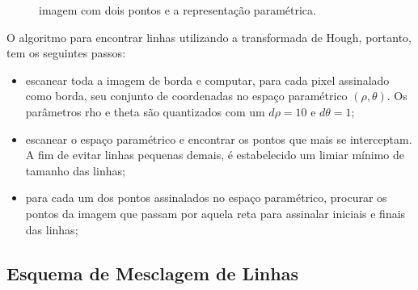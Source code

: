 \begin{figure}[h]
  \centering
  \hfill
  \caption{imagem com dois pontos e a representação paramétrica.}
  \label{houghlinhas}
\end{figure}


O algoritmo para encontrar linhas utilizando a transformada de Hough, portanto, tem os seguintes passos: 
\begin{itemize}
\item escanear toda a imagem de borda e computar, para cada pixel assinalado como borda, seu conjunto de coordenadas no espaço paramétrico $(\rho,\theta)$. Os parâmetros rho e theta são quantizados com um $d\rho = 10$ e $d\theta = 1$;
\item escanear o espaço paramétrico e encontrar os pontos que mais se interceptam. A fim de evitar linhas pequenas demais, é estabelecido um limiar mínimo de tamanho das linhas;
\item para cada um dos pontos assinalados no espaço paramétrico, procurar os pontos da imagem que passam por aquela reta para assinalar iniciais e finais das linhas;
\end{itemize}

\subsection{Esquema de Mesclagem de Linhas}

